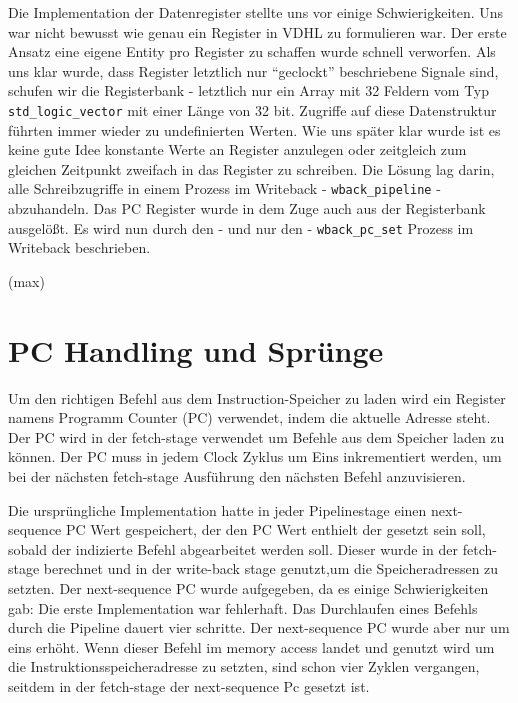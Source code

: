 \documentclass[paper=a4,fontsize=12pt,twocolumn]{scrreprt}
\begin{document}

Die Implementation der Datenregister stellte uns vor einige Schwierigkeiten.
Uns war nicht bewusst wie genau ein Register in VDHL zu formulieren war.
Der erste Ansatz eine eigene Entity pro Register zu schaffen wurde schnell verworfen.
Als uns klar wurde, dass Register letztlich nur \enquote{geclockt} beschriebene Signale sind, schufen wir die Registerbank - letztlich nur ein Array mit 32 Feldern vom  Typ \texttt{std\_logic\_vector} mit einer Länge von 32 bit.
Zugriffe auf diese Datenstruktur führten immer wieder zu undefinierten Werten.
Wie uns später klar wurde ist es keine gute Idee konstante Werte an Register anzulegen oder zeitgleich zum gleichen Zeitpunkt zweifach in das Register zu schreiben.
Die Lösung lag darin, alle Schreibzugriffe in einem Prozess im Writeback - \texttt{wback\_pipeline} - abzuhandeln.
Das PC Register wurde in dem Zuge auch aus der Registerbank ausgelößt. 
Es wird nun durch den - und nur den - \texttt{wback\_pc\_set} Prozess im Writeback beschrieben. %

(max)

\section{PC Handling und Sprünge}
Um den richtigen Befehl aus dem Instruction-Speicher zu laden wird ein Register namens Programm Counter (PC) verwendet, indem die aktuelle Adresse steht.
Der PC wird in der fetch-stage verwendet um Befehle aus dem Speicher laden zu können.
Der PC muss in jedem Clock Zyklus um Eins inkrementiert werden, um bei der nächsten fetch-stage Ausführung den nächsten Befehl anzuvisieren. 

Die ursprüngliche Implementation hatte in jeder Pipelinestage einen next-sequence PC Wert gespeichert, der den PC Wert enthielt der gesetzt sein soll, sobald der indizierte Befehl abgearbeitet werden soll.
Dieser wurde in der fetch-stage berechnet und in der write-back stage genutzt,um die Speicheradressen zu setzten. 
Der next-sequence PC wurde aufgegeben, da es einige Schwierigkeiten gab:
Die erste Implementation war fehlerhaft.
Das Durchlaufen eines Befehls durch die Pipeline dauert vier schritte.
Der next-sequence PC wurde aber nur um eins erhöht.
Wenn dieser Befehl im memory access landet und genutzt wird um die Instruktionsspeicheradresse zu setzten, sind schon vier Zyklen vergangen, seitdem in der fetch-stage der next-sequence Pc gesetzt ist.
\end{document}
